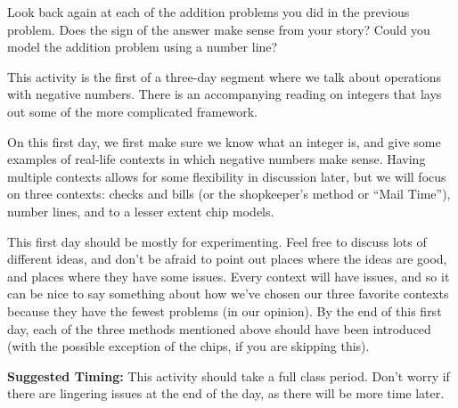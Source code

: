 \documentclass{ximera}
\begin{document}
\begin{problem}
Look back again at each of the addition problems you did in the previous problem.  Does the sign of the answer make sense from your story?  Could you model the addition problem using a number line?

\end{problem}


\newpage
\begin{instructorNotes}
This activity is the first of a three-day segment where we talk about operations with negative numbers.  There is an accompanying reading on integers that lays out some of the more complicated framework.

On this first day, we first make sure we know what an integer is, and give some examples of real-life contexts in which negative numbers make sense.  Having multiple contexts allows for some flexibility in discussion later, but we will focus on three contexts: checks and bills (or the shopkeeper's method or ``Mail Time''), number lines, and to a lesser extent chip models.

This first day should be mostly for experimenting.  Feel free to discuss lots of different ideas, and don't be afraid to point out places where the ideas are good, and places where they have some issues.  Every context will have issues, and so it can be nice to say something about how we've chosen our three favorite contexts because they have the fewest problems (in our opinion).  By the end of this first day, each of the three methods mentioned above should have been introduced (with the possible exception of the chips, if you are skipping this).

{\bf Suggested Timing:} This activity should take a full class period.  Don't worry if there are lingering issues at the end of the day, as there will be more time later.
\end{instructorNotes}
\end{document}
